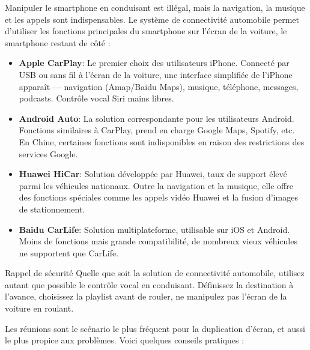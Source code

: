
Manipuler le smartphone en conduisant est illégal, mais la navigation, la musique et les appels sont indispensables. Le système de connectivité automobile permet d'utiliser les fonctions principales du smartphone sur l'écran de la voiture, le smartphone restant de côté :

\begin{itemize}
  \item \textbf{Apple CarPlay}: Le premier choix des utilisateurs iPhone. Connecté par USB ou sans fil à l'écran de la voiture, une interface simplifiée de l'iPhone apparaît — navigation (Amap/Baidu Maps), musique, téléphone, messages, podcasts. Contrôle vocal Siri mains libres.
  \item \textbf{Android Auto}: La solution correspondante pour les utilisateurs Android. Fonctions similaires à CarPlay, prend en charge Google Maps, Spotify, etc. En Chine, certaines fonctions sont indisponibles en raison des restrictions des services Google.
  \item \textbf{Huawei HiCar}: Solution développée par Huawei, taux de support élevé parmi les véhicules nationaux. Outre la navigation et la musique, elle offre des fonctions spéciales comme les appels vidéo Huawei et la fusion d'images de stationnement.
  \item \textbf{Baidu CarLife}: Solution multiplateforme, utilisable sur iOS et Android. Moins de fonctions mais grande compatibilité, de nombreux vieux véhicules ne supportent que CarLife.
\end{itemize}

\begin{tcbwarn}{Rappel de sécurité}
Quelle que soit la solution de connectivité automobile, utilisez autant que possible le contrôle vocal en conduisant. Définissez la destination à l'avance, choisissez la playlist avant de rouler, ne manipulez pas l'écran de la voiture en roulant.

\end{tcbwarn}


Les réunions sont le scénario le plus fréquent pour la duplication d'écran, et aussi le plus propice aux problèmes. Voici quelques conseils pratiques :

